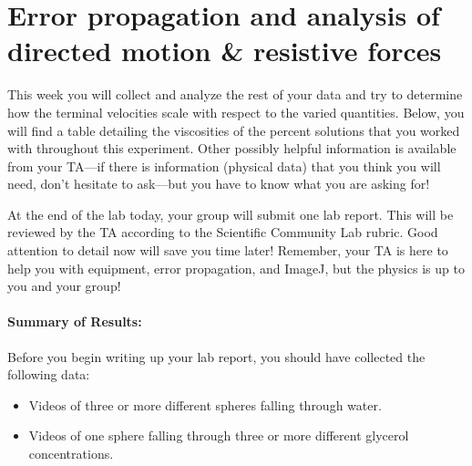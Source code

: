 \section{Error propagation and analysis of directed motion \& resistive forces}
This week you will collect and analyze the rest of your data and try to determine how the terminal velocities scale with respect to the varied quantities.
Below, you will find a table detailing the viscosities of the percent solutions that you worked with throughout this experiment.
Other possibly helpful information is available from your TA—if there is information (physical data) that you think you will need, don't hesitate to ask—but you have to know what you are asking for! \par
At the end of the lab today, your group will submit one lab report.
This will be reviewed by the TA according to the Scientific Community Lab rubric.
Good attention to detail now will save you time later!
Remember, your TA is here to help you with equipment, error propagation, and ImageJ, but the physics is up to you and your group!
\bigskip 
\begin{table}[h]
\centering
{}
\caption{Viscosity of glycerol concentrations by \% volume}
\label{tab:viscosity}
\end{table}

\paragraph{Summary of Results:\\} 
Before you begin writing up your lab report, you should have collected the following data:
\begin{itemize}
\item Videos of three or more different spheres falling through water.
\item Videos of one sphere falling through three or more different glycerol concentrations.
\end{itemize}

